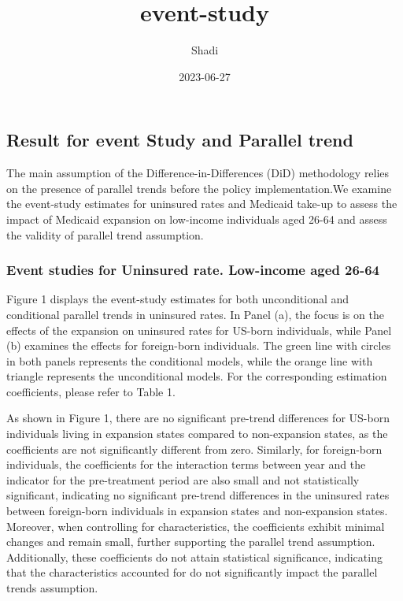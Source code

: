 \documentclass[
]{article}
\title{event-study}
\author{Shadi}
\date{2023-06-27}
\begin{document}
\maketitle

\hypertarget{result-for-event-study-and-parallel-trend}{%
\subsection{Result for event Study and Parallel
trend}\label{result-for-event-study-and-parallel-trend}}

The main assumption of the Difference-in-Differences (DiD) methodology
relies on the presence of parallel trends before the policy
implementation.We examine the event-study estimates for uninsured rates
and Medicaid take-up to assess the impact of Medicaid expansion on
low-income individuals aged 26-64 and assess the validity of parallel
trend assumption.

\hypertarget{event-studies-for-uninsured-rate.-low-income-aged-26-64}{%
\subsubsection{Event studies for Uninsured rate. Low-income aged
26-64}\label{event-studies-for-uninsured-rate.-low-income-aged-26-64}}

Figure 1 displays the event-study estimates for both unconditional and
conditional parallel trends in uninsured rates. In Panel (a), the focus
is on the effects of the expansion on uninsured rates for US-born
individuals, while Panel (b) examines the effects for foreign-born
individuals. The green line with circles in both panels represents the
conditional models, while the orange line with triangle represents the
unconditional models. For the corresponding estimation coefficients,
please refer to Table 1.

As shown in Figure 1, there are no significant pre-trend differences for
US-born individuals living in expansion states compared to non-expansion
states, as the coefficients are not significantly different from zero.
Similarly, for foreign-born individuals, the coefficients for the
interaction terms between year and the indicator for the pre-treatment
period are also small and not statistically significant, indicating no
significant pre-trend differences in the uninsured rates between
foreign-born individuals in expansion states and non-expansion states.
Moreover, when controlling for characteristics, the coefficients exhibit
minimal changes and remain small, further supporting the parallel trend
assumption. Additionally, these coefficients do not attain statistical
significance, indicating that the characteristics accounted for do not
significantly impact the parallel trends assumption.
\end{document}
